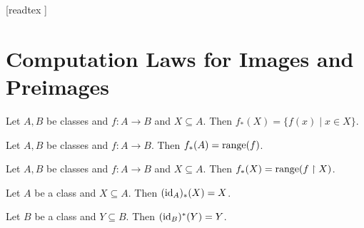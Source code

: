 \documentclass[10pt]{article}
\begin{document}
  \begin{imports}
    \begin{forthel}
      [readtex ]
    \end{forthel}
  \end{imports}


  \section*{Computation Laws for Images and Preimages}

  \begin{forthel}
    \begin{proposition}[id=FOUNDATIONS_07_5919649206108160,printid]
      Let $A, B$ be classes and $f : A \to B$ and $X \subseteq A$.
      Then $f_{*}(X) = \{ f(x) \mid x \in X \}$.
    \end{proposition}
  \end{forthel}

  \begin{forthel}
    \begin{corollary}[id=FOUNDATIONS_07_5543924730953728,printid]
      Let $A, B$ be classes and $f : A \to B$.
      Then $f_{*}(A) = \textrm{range}(f)$.
    \end{corollary}
  \end{forthel}

  \begin{forthel}
    \begin{corollary}[id=FOUNDATIONS_07_1818812171157504,printid]
      Let $A, B$ be classes and $f : A \to B$ and $X \subseteq A$.
      Then $f_{*}(X) = \textrm{range}(f \restriction X)$.
    \end{corollary}
  \end{forthel}

  \begin{forthel}
    \begin{proposition}[id=FOUNDATIONS_07_911395830890496,printid]
      Let $A$ be a class and $X \subseteq A$.
      Then $(\textrm{id}_{A})_{*}(X) = X$.
    \end{proposition}
  \end{forthel}

  \begin{forthel}
    \begin{proposition}[id=FOUNDATIONS_07_3349817830932480,printid]
      Let $B$ be a class and $Y \subseteq B$.
      Then $(\textrm{id}_{B})^{*}(Y) = Y$.
    \end{proposition}
  \end{forthel}
\end{document}
